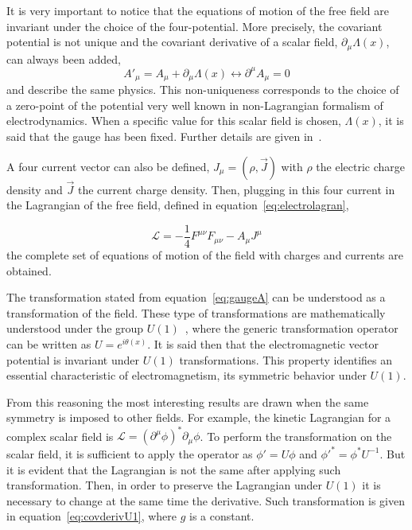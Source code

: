 It is very important to notice that the equations of motion of the free field are invariant under the choice of the four-potential. More precisely, the covariant potential is not unique and the covariant derivative of a scalar field, $\partial_{\mu}\Lambda(x)$, can always been added, 
\begin{equation}
  \label{eq:gaugeA}
  {A'}_{\mu}=A_{\mu}+\partial_{\mu}\Lambda(x) \leftrightarrow \partial^{\mu}A_{\mu}=0
\end{equation} and describe the same physics. This non-uniqueness corresponds to the choice of a zero-point of the potential very well known in non-Lagrangian formalism of electrodynamics. When a specific value for this scalar field is chosen, $\Lambda(x)$, it is said that the gauge has been fixed. Further details are given in~\cite{Jackson:1998nia}.

A four current vector can also be defined, $J_{\mu}=\left( \rho,\vec{J} \right)$ with $\rho$ the electric charge density and $\vec{J}$ the current charge density. Then, plugging in this four current in the Lagrangian of the free field, defined in equation~\ref{eq:electrolagran}, 

\begin{equation}
  \label{eq:fulleleclagrangian}
  \mathcal{L}=-\frac{1}{4}F^{\mu\nu}F_{\mu\nu}-A_{\mu}J^{\mu}
\end{equation}the complete set of equations of motion of the field with charges and currents are obtained.

The transformation stated from equation~\ref{eq:gaugeA} can be understood as a transformation of the field. These type of transformations are mathematically understood under the group $U(1)$~\cite{Georgi:1999wka}, where the generic transformation operator can be written as $U=e^{i\theta(x)}$. It is said then that the electromagnetic vector potential is invariant under $U(1)$ transformations. This property identifies an essential characteristic of electromagnetism, its symmetric behavior under $U(1)$. 

From this reasoning the most interesting results are drawn when the same symmetry is imposed to other fields. For example, the kinetic Lagrangian for a complex scalar field is $\mathcal{L}=(\partial^{\mu}\phi)^{*}\partial_{\mu}\phi$. To perform the transformation on the scalar field, it is sufficient to apply the operator as $\phi'=U\phi$ and ${\phi'}^{*}={\phi}^{*} U^{-1}$. But it is evident that the Lagrangian is not the same after applying such transformation. Then, in order to preserve the Lagrangian under $U(1)$ it is necessary to change at the same time the derivative. Such transformation is given in equation~\ref{eq:covderivU1}, where $g$ is a constant.

